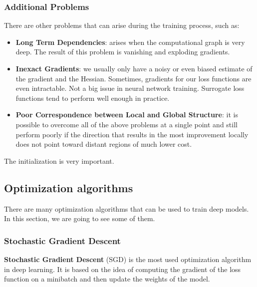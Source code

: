 \subsubsection{Additional Problems}
There are other problems that can arise during the training process, such as:
\begin{itemize}
    \item \textbf{Long Term Dependencies}: arises when the computational graph
          is very deep. The result of this problem is vanishing and exploding
          gradients.
    \item \textbf{Inexact Gradients}: we usually only have a noisy or even biased
          estimate of the gradient and the Hessian. Sometimes, gradients for our
          loss functions are even intractable. Not a big issue in neural network
          training. Surrogate loss functions tend to perform well enough in practice.
    \item \textbf{Poor Correspondence between Local and Global Structure}: it is
          possible to overcome all of the above problems at a single point and
          still perform poorly if the direction that results in the most
          improvement locally does not point toward distant regions of much
          lower cost.
\end{itemize}
\begin{note}
    The initialization is very important.
\end{note}
\subsection{Optimization algorithms}
There are many optimization algorithms that can be used to train deep models.
In this section, we are going to see some of them.
\subsubsection{Stochastic Gradient Descent}
\textbf{Stochastic Gradient Descent} (SGD) is the most used optimization algorithm
in deep learning. It is based on the idea of computing the gradient of the loss
function on a minibatch and then update the weights of the model.

